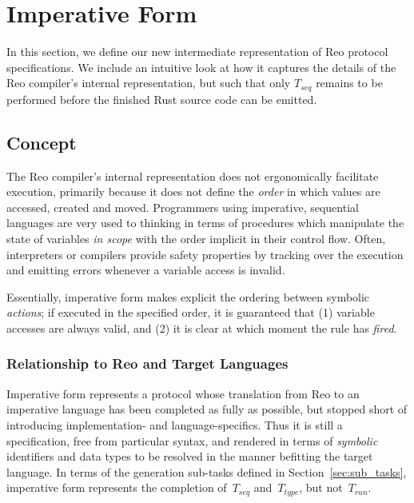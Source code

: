 \section{Imperative Form}
\label{sec:imperative_form_sec}
In this section, we define our new intermediate representation of Reo protocol specifications. We include an intuitive look at how it captures the details of the Reo compiler's internal representation, but such that only $T_{seq}$ remains to be performed before the finished Rust source code can be emitted.

\subsection{Concept}
The Reo compiler's internal representation does not ergonomically facilitate execution, primarily because it does not define the \textit{order} in which values are accessed, created and moved. Programmers using imperative, sequential languages are very used to thinking in terms of procedures which manipulate the state of variables \textit{in scope} with the order implicit in their control flow. Often, interpreters or compilers provide safety properties by tracking over the execution and emitting errors whenever a variable access is invalid.

Essentially, imperative form makes explicit the ordering between symbolic \textit{actions}; if executed in the specified order, it is guaranteed that (1) variable accesses are always valid, and (2) it is clear at which moment the rule has \textit{fired}.

\subsubsection{Relationship to Reo and Target Languages}
Imperative form represents a protocol whose translation from Reo to an imperative language has been completed as fully as possible, but stopped short of introducing implementation- and language-specifics. Thus it is still a specification, free from particular syntax, and rendered in terms of \textit{symbolic} identifiers and data types to be resolved in the manner befitting the target language. In terms of the generation sub-tasks defined in Section~\ref{sec:sub_tasks}, imperative form represents the completion of~$T_{seq}$ and~$T_{type}$, but not~$T_{run}$.

